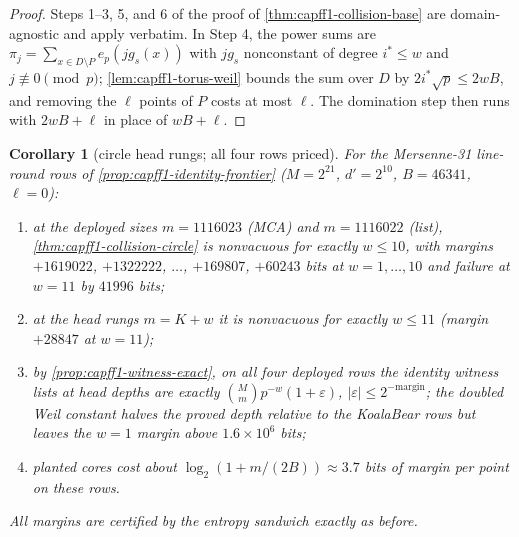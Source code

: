 \documentclass[11pt]{article}
\newtheorem{corollary}[corollary]{Corollary}
\theoremstyle{definition}
\theoremstyle{remark}
\begin{document}
\begin{proof}
Steps 1--3, 5, and 6 of the proof of \cref{thm:capff1-collision-base} are domain-agnostic and apply verbatim.  In Step 4, the power sums are $\pi_j=\sum_{x\in D\setminus P}e_p(jg_s(x))$ with $jg_s$ nonconstant of degree $i^*\le w$ and $j\not\equiv0\pmod p$; \cref{lem:capff1-torus-weil} bounds the sum over $D$ by $2i^*\sqrt p\le2wB$, and removing the $\ell$ points of $P$ costs at most $\ell$.  The domination step then runs with $2wB+\ell$ in place of $wB+\ell$.
\end{proof}

\begin{corollary}[circle head rungs; all four rows priced]\label{cor:capff1-circle-head}
For the Mersenne-31 line-round rows of \cref{prop:capff1-identity-frontier} \textup{($M=2^{21}$, $d'=2^{10}$, $B=46341$, $\ell=0$)}:
\begin{enumerate}[label=\textup{(\alph*)}]
\item at the deployed sizes $m=1116023$ \textup{(MCA)} and $m=1116022$ \textup{(list)}, \cref{thm:capff1-collision-circle} is nonvacuous for exactly $w\le10$, with margins $+1619022$, $+1322222$, $\ldots$, $+169807$, $+60243$ bits at $w=1,\ldots,10$ and failure at $w=11$ by $41996$ bits;
\item at the head rungs $m=K+w$ it is nonvacuous for exactly $w\le11$ \textup{(margin $+28847$ at $w=11$)};
\item by \cref{prop:capff1-witness-exact}, on all four deployed rows the identity witness lists at head depths are exactly $\binom Mm p^{-w}(1+\varepsilon)$, $|\varepsilon|\le2^{-\mathrm{margin}}$; the doubled Weil constant halves the proved depth relative to the KoalaBear rows but leaves the $w=1$ margin above $1.6\times10^6$ bits;
\item planted cores cost about $\log_2(1+m/(2B))\approx3.7$ bits of margin per point on these rows.
\end{enumerate}
All margins are certified by the entropy sandwich exactly as before.
\end{corollary}
\end{document}
